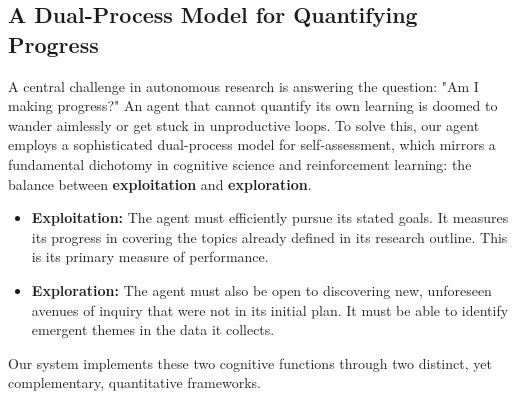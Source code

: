 \documentclass[12pt, a4paper]{article}
\begin{document}



\subsection{A Dual-Process Model for Quantifying Progress}

A central challenge in autonomous research is answering the question: "Am I making progress?" An agent that cannot quantify its own learning is doomed to wander aimlessly or get stuck in unproductive loops. To solve this, our agent employs a sophisticated dual-process model for self-assessment, which mirrors a fundamental dichotomy in cognitive science and reinforcement learning: the balance between \textbf{exploitation} and \textbf{exploration}.

\begin{itemize}
    \item \textbf{Exploitation:} The agent must efficiently pursue its stated goals. It measures its progress in covering the topics already defined in its research outline. This is its primary measure of performance.
    \item \textbf{Exploration:} The agent must also be open to discovering new, unforeseen avenues of inquiry that were not in its initial plan. It must be able to identify emergent themes in the data it collects.
\end{itemize}

Our system implements these two cognitive functions through two distinct, yet complementary, quantitative frameworks.
\end{document}
